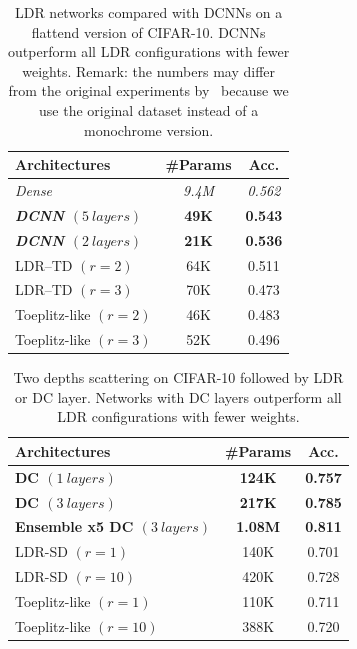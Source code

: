 \begin{table}[htb]
  \centering
  \begin{tabular}{lcc}
    \toprule
    \textbf{Architectures} & \textbf{\#Params} & \textbf{Acc.}  \\
    \midrule
    \textit{Dense} & \textit{9.4M}	& \textit{0.562} \\
    \textbf{\textit{DCNN $(5\ layers)$}} & \textbf{49K}	& \textbf{0.543} \\
    \textbf{\textit{DCNN $(2\ layers)$}} & \textbf{21K} & \textbf{0.536} \\
    LDR--TD	$(r = 2)$	        & 64K	& 0.511 \\
    LDR--TD	$(r = 3)$	        & 70K	& 0.473 \\
    Toeplitz-like $(r=2)$	    & 46K	& 0.483 \\
    Toeplitz-like $(r =3)$	    & 52K    & 0.496 \\
    \bottomrule
    \end{tabular}
    \caption{LDR networks compared with DCNNs on a flattend version of CIFAR-10. DCNNs outperform all LDR configurations with fewer weights. Remark: the numbers may differ from the original experiments by~\citet{thomas2018learning} because we use the original dataset instead of a monochrome version.}
    \label{table:xp_ldr}
\end{table}

\begin{table}[htb]
  \centering
  \begin{tabular}{lcc}
    \toprule
    \textbf{Architectures} & \textbf{\#Params} & \textbf{Acc.}  \\
    \midrule
    \textbf{DC $(1\ layers)$} & \textbf{124K} & \textbf{0.757} \\
    \textbf{DC $(3\ layers)$} & \textbf{217K} & \textbf{0.785} \\
    \textbf{Ensemble x5 DC $(3\ layers)$} &  \textbf{1.08M} & \textbf{0.811} \\
    LDR-SD $(r=1)$ & 140K & 0.701 \\
    LDR-SD $(r=10)$ & 420K & 0.728 \\
    Toeplitz-like $(r=1)$ & 110K & 0.711 \\
    Toeplitz-like $(r=10)$ & 388K & 0.720 \\
    \bottomrule
    \end{tabular}
    \caption{Two depths scattering on CIFAR-10 followed by LDR or DC layer. Networks with DC layers outperform all LDR configurations with fewer weights.}
    \label{table:xp_ldr_scattering}
\end{table}


